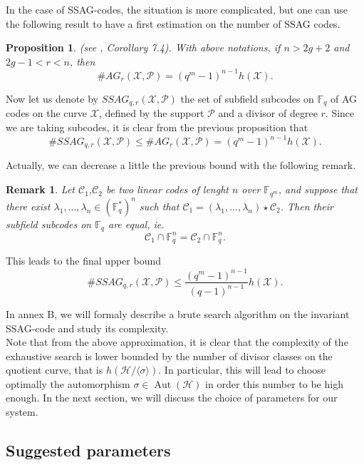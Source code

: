 \documentclass[10pt]{article}
\newtheorem{prop1}[thm]{Proposition}
\newtheorem{rq1}[thm]{Remark}
\newcommand{\s}{\vspace{0.3cm}}
\newcommand{\C}{\mathcal{C}}
\newcommand{\fqm}{\mathbb{F}_{q^m}}
\newcommand{\fq}{\mathbb{F}_q}
\newcommand{\X}{\mathcal{X}}
\newcommand{\PR}{\mathcal{P}}
\newcommand{\Aut}{\operatorname{Aut}}
\begin{document}
\s

In the case of SSAG-codes, the situation is more complicated, but one can use the following result to have a first estimation on the number of SSAG codes.

\s

\begin{prop1} \rm (see \cite{CMRP}, Corollary 7.4). \it 
With above notations, if $n>2g+2$ and $2g-1<r<n$, then 
\[\#AG_r(\X,\PR) = (q^m-1)^{n-1}h(\X).\]
\end{prop1}

Now let us denote by $SSAG_{q,r}(\X,\PR)$ the set of subfield subcodes on $\fq$ of AG codes on the curve $\X$, defined by the support $\PR$ and a divisor of degree $r$. Since we are taking subcodes, it is clear from the previous proposition that 
\[\#SSAG_{q,r}(\X,\PR) \leq \#AG_r(\X,\PR) = (q^m-1)^{n-1}h(\X).\]

Actually, we can decrease a little the previous bound with the following remark.

\s

\begin{rq1} \rm
Let $\C_1$,$\C_2$ be two linear codes of lenght $n$ over $\fqm$, and suppose that there exist $\lambda_1,...,\lambda_n \in (\fq^*)^n$ such that $\C_1 = (\lambda_1,...,\lambda_n) \star \C_2$. Then their subfield subcodes on $\fq$ are equal, ie.
\[\C_1 \cap \fq^n = \C_2 \cap \fq^n.\]
\end{rq1}

\s

This leads to the final upper bound 
\begin{equation} \label{nb of sssag}
 \#SSAG_{q,r}(\X,\PR) \leq \dfrac{(q^m-1)^{n-1}}{(q-1)^{n-1}}h(\X).
\end{equation} 

\s

In annex B, we will formaly describe a brute search algorithm on the invariant SSAG-code and study its complexity. \\
Note that from the above approximation, it is clear that the complexity of the exhaustive search is lower bounded by the number of divisor classes on the quotient curve, that is $h(\mathcal{H}/\langle \sigma \rangle)$. In particular, this will lead to choose optimally the automorphism $\sigma \in \Aut(\mathcal{H})$ in order this number to be high enough. In the next section, we will discuss the choice of parameters for our system.

\s

\subsection{Suggested parameters}
\end{document}
